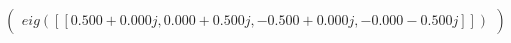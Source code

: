 \documentclass[border=1em]{standalone}
\begin{document}
$
\left(
\begin{array}{cccc}
eig([[0.500+0.000j, 0.000+0.500j, -0.500+0.000j, -0.000-0.500j]])
\end{array}
\right)
$
\end{document}
